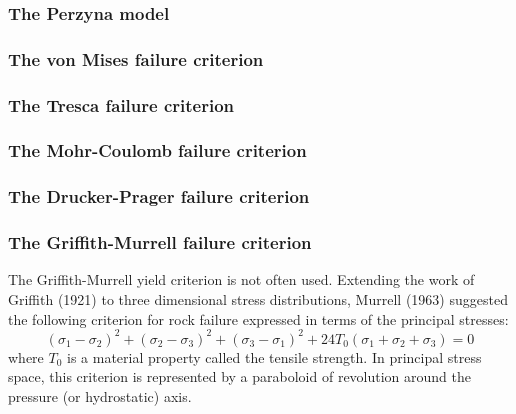 \newpage
\subsubsection{The Perzyna model}\label{sec:perzyna}


\newpage
\subsubsection{The von Mises failure criterion}\label{sec:vMcriterion}


\subsubsection{The Tresca failure criterion}\label{sec:trcriterion}


\subsubsection{The Mohr-Coulomb failure criterion}\label{sec:mccriterion}


\subsubsection{The Drucker-Prager failure criterion \label{sec:dpcriterion}}


\subsubsection{The Griffith-Murrell failure criterion}

The Griffith-Murrell yield criterion \cite{brau94,brbe95,babr97} is not often used. 
Extending the work of Griffith (1921) to three dimensional stress distributions, 
Murrell (1963) suggested the following criterion for rock failure expressed 
in terms of the principal stresses:
\[
(\sigma_1-\sigma_2)^2 + (\sigma_2-\sigma_3)^2 + (\sigma_3-\sigma_1)^2
+
24T_0 (\sigma_1+\sigma_2+\sigma_3)=0
\]
where $T_0$ is a material property called the tensile strength. In principal stress space, 
this criterion is represented by a paraboloid of revolution around the pressure (or hydrostatic) axis.


